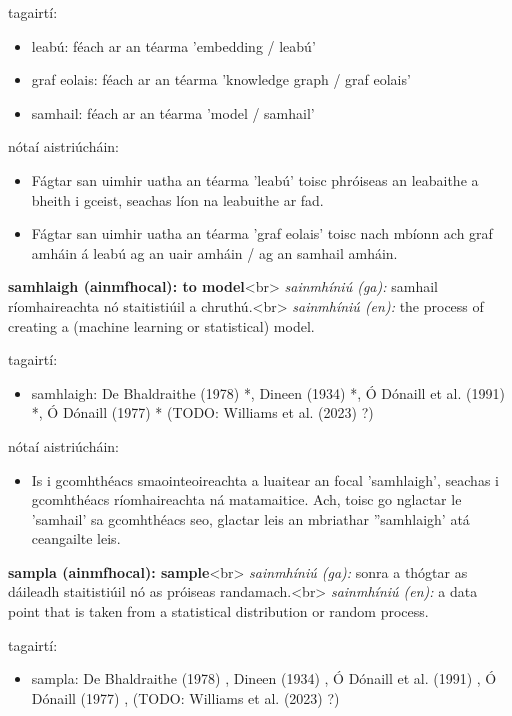 \documentclass{article}
\begin{document}
tagairtí:
\begin{itemize}
	\item leabú: féach ar an téarma 'embedding / leabú'
	\item graf eolais: féach ar an téarma 'knowledge graph / graf eolais'
	\item samhail: féach ar an téarma 'model / samhail'
\end{itemize}

nótaí aistriúcháin:
\begin{itemize}
	\item Fágtar san uimhir uatha an téarma 'leabú' toisc phróiseas an leabaithe a bheith i gceist, seachas líon na leabuithe ar fad.
	\item Fágtar san uimhir uatha an téarma 'graf eolais' toisc nach mbíonn ach graf amháin á leabú ag an uair amháin / ag an samhail amháin.
\end{itemize}


\textbf{samhlaigh (ainmfhocal): to model}<br>
\textit{sainmhíniú (ga):} samhail ríomhaireachta nó staitistiúil a chruthú.<br>
\textit{sainmhíniú (en):} the process of creating a (machine learning or statistical) model.

tagairtí:
\begin{itemize}
	\item samhlaigh: De Bhaldraithe (1978) \cite{de-bhaldraithe}*, Dineen (1934) \cite{dineen}*, Ó Dónaill et al. (1991) \cite{focloir-beag}*, Ó Dónaill (1977) \cite{odonaill}* (TODO: Williams et al. (2023) \cite{storchiste}?)
\end{itemize}

nótaí aistriúcháin:
\begin{itemize}
	\item Is i gcomhthéacs smaointeoireachta a luaitear an focal 'samhlaigh', seachas i gcomhthéacs ríomhaireachta ná matamaitice. Ach, toisc go nglactar le 'samhail' sa gcomhthéacs seo, glactar leis an mbriathar ''samhlaigh' atá ceangailte leis.
\end{itemize}


\textbf{sampla (ainmfhocal): sample}<br>
\textit{sainmhíniú (ga):} sonra a thógtar as dáileadh staitistiúil nó as próiseas randamach.<br>
\textit{sainmhíniú (en):} a data point that is taken from a statistical distribution or random process.

tagairtí:
\begin{itemize}
	\item sampla: De Bhaldraithe (1978) \cite{de-bhaldraithe}, Dineen (1934) \cite{dineen}, Ó Dónaill et al. (1991) \cite{focloir-beag}, Ó Dónaill (1977) \cite{odonaill}, (TODO: Williams et al. (2023) \cite{storchiste}?)
\end{itemize}
\end{document}
